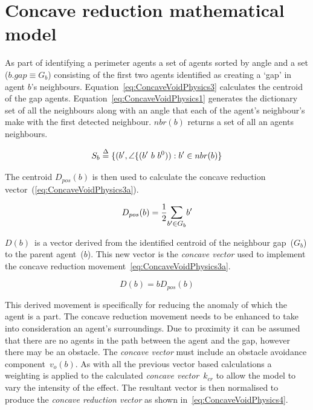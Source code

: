 \documentclass{ieeeaccess}
\begin{document}
\section{Concave reduction mathematical model}\label{concave:ConcaveVoidReduction1}
As part of identifying a perimeter agents a set of agents sorted by angle and a set ($b.gap \equiv G_b$) consisting of the first two agents identified as creating a `gap' in agent $b$'s neighbours. Equation~\ref{eq:ConcaveVoidPhysics3} calculates the centroid of the gap agents. 
Equation~\ref{eq:ConcaveVoidPhysics1} generates the dictionary set of all the neighbours along with an angle that each of the agent's neighbour's make with the first detected neighbour. $nbr(b)$ returns a set of all an agents neighbours.

\begin{equation}
\label{eq:ConcaveVoidPhysics1}
S_b \buildrel \Delta \over = \{(b',\angle\{(b'~b~b^0)) : b' \in nbr(b)\}
\end{equation}

The centroid $D_{pos}(b)$ is then used to calculate the concave reduction vector~(\ref{eq:ConcaveVoidPhysics3a}).

\begin{equation}
\label{eq:ConcaveVoidPhysics3}
D_{pos}(b) = \frac{1}{2}\mathlarger{\sum_{b' \in G_b}}{b'} 
\end{equation}

$D(b)$~is a vector derived from the identified centroid of the neighbour gap~($G_b$) to the parent agent~($b$). This new vector is the \textit{concave vector} used to implement the concave reduction movement~\ref{eq:ConcaveVoidPhysics3a}.

\begin{equation}\label{eq:ConcaveVoidPhysics3a}
D(b) = bD_{pos}(b) 
\end{equation}

This derived movement is specifically for reducing the anomaly of which the agent is a part. The concave reduction movement needs to be enhanced to take into consideration an agent's surroundings. Due to proximity it can be assumed that there are no agents in the path between the agent and the gap, however there may be an obstacle. The \textit{concave vector} must include an obstacle avoidance component~$v_o(b)$. As with all the previous vector based calculations a weighting is applied to the calculated \textit{concave vector}~$k_{cr}$ to allow the model to vary the intensity of the effect. The resultant vector is then normalised to produce the \textit{concave reduction vector} as shown in~\ref{eq:ConcaveVoidPhysics4}. 
\end{document}
